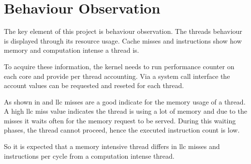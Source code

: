 \section{Behaviour Observation}
\label{design:behaviour}

The key element of this project is behaviour observation.
The threads behaviour is displayed through its resource usage.
Cache misses and instructions show how memory and computation intense a thread
is.

To acquire these information, the kernel needs to run performance counter on
each core and provide per thread accounting.
Via a system call interface the account values can be requested and reseted for
each thread.

As shown in \cite{zhuravlev_addressing_2010} and \cite{knauerhase_using_2008}
\gls{llc} misses are a good indicate for the memory usage of a thread.
A high \gls{llc} miss value indicates the thread is using a lot of memory and
due to the misses it waits often for the memory request to be served.
During this waiting phases, the thread cannot proceed, hence the executed
instruction count is low.

So it is expected that a memory intensive thread differs in \gls{llc} misses
and instructions per cycle from a computation intense thread.



